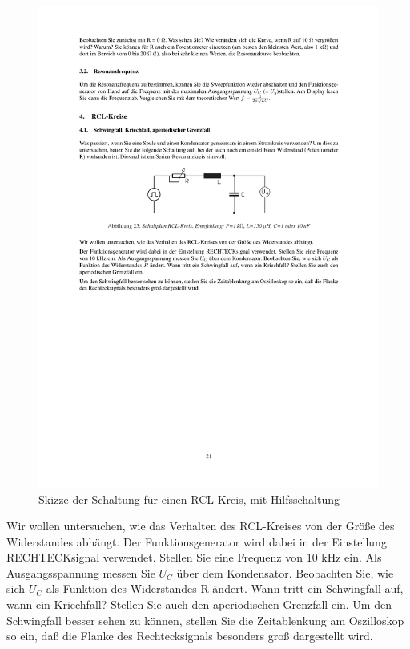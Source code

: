 \documentclass[12pt]{scrartcl}
\begin{document}
\begin{figure}[htbp] 
  \centering
    \includegraphics[trim = 20mm 165mm 1mm 95mm, clip, scale = 1]{RCL_kreis.pdf}
  	\caption[Skizze der Schaltung für einen RCL-Kreis, mit Hilfsschaltung]{Skizze der Schaltung für einen RCL-Kreis, mit Hilfsschaltung\footnotemark}
  \label{fig:LC-Kreis_hilfe}
\end{figure}
Wir wollen untersuchen, wie das Verhalten des RCL-Kreises von der Größe des Widerstandes abhängt. Der Funktionsgenerator wird dabei in der Einstellung RECHTECKsignal verwendet. Stellen Sie eine Frequenz von 10 kHz ein. Als Ausgangsspannung messen Sie
$U_C$ über dem Kondensator. Beobachten Sie, wie sich $U_C$
als Funktion des Widerstandes
R ändert. Wann tritt ein Schwingfall auf, wann ein Kriechfall? Stellen Sie auch den
aperiodischen Grenzfall ein. Um den Schwingfall besser sehen zu können, stellen Sie die Zeitablenkung am Oszilloskop so ein, daß die Flanke des Rechtecksignals besonders groß dargestellt wird.
\end{document}
